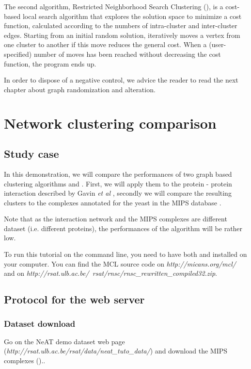 The second algorithm, Restricted Neighborhood Search Clustering (), 
is a cost-based local search
algorithm that explores the solution space to minimize a cost
function, calculated according to the numbers of intra-cluster and
inter-cluster edges. Starting from an initial random solution, 
iteratively moves a vertex from one cluster to another if this
move reduces the general cost. When a (user-specified) number of moves
has been reached without decreasing the cost function, the program
ends up.

In order to dispose of a negative control, we advice the reader to read the next chapter about graph randomization and alteration. 

\section{Network clustering comparison}
\subsection{Study case}

In this demonstration, we will compare the performances of two graph based clustering algorithms
 and . First, we will apply them to the protein - protein interaction described by Gavin \textit{et al} \cite{Gavin2006}, secondly we will compare the resulting clusters to the complexes annotated for the yeast in the MIPS database \cite{Mewes2007}.

Note that as the 
interaction network and the MIPS complexes are different dataset (i.e. different proteins), the performances of the algorithm
will be rather low.

To run this tutorial on the command line, you need to have both  and  installed on your computer. You can find the MCL source code on \textit{http://micans.org/mcl/} and  on \textit{http://rsat.ulb.ac.be/~rsat/rnsc/rnsc\_rewritten\_compiled32.zip}. 

\subsection{Protocol for the web server}

\subsubsection{Dataset download}
Go on the NeAT demo dataset web page (\textit{http://rsat.ulb.ac.be/rsat/data/neat\_tuto\_data/}) and download the MIPS complexes ()..

